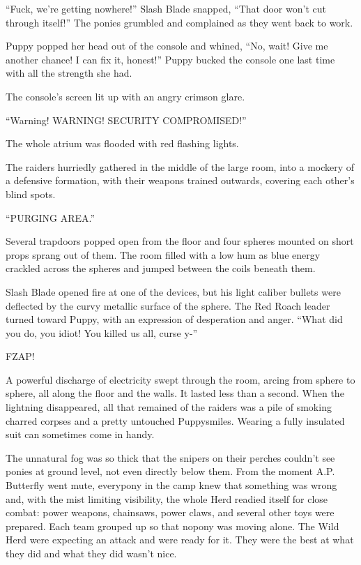 ``Fuck, we're getting nowhere!'' Slash Blade snapped, ``That door won't cut through itself!'' The ponies grumbled and complained as they went back to work.

Puppy popped her head out of the console and whined, ``No, wait! Give me another chance! I can fix it, honest!'' Puppy bucked the console one last time with all the strength she had.

The console's screen lit up with an angry crimson glare.

``{\mt Warning! WARNING! SECURITY COMPROMISED!}''

The whole atrium was flooded with red flashing lights.

The raiders hurriedly gathered in the middle of the large room, into a mockery of a defensive formation, with their weapons trained outwards, covering each other's blind spots.

``{\mt PURGING AREA.}''

Several trapdoors popped open from the floor and four spheres mounted on short props sprang out of them. The room filled with a low hum as blue energy crackled across the spheres and jumped between the coils beneath them.

Slash Blade opened fire at one of the devices, but his light caliber bullets were deflected by the curvy metallic surface of the sphere. The Red Roach leader turned toward Puppy, with an expression of desperation and anger. ``What did you do, you idiot! You killed us all, curse y-''

FZAP!

A powerful discharge of electricity swept through the room, arcing from sphere to sphere, all along the floor and the walls. It lasted less than a second. When the lightning disappeared, all that remained of the raiders was a pile of smoking charred corpses and a pretty untouched Puppysmiles. Wearing a fully insulated suit can sometimes come in handy.

\horizonline


The unnatural fog was so thick that the snipers on their perches couldn't see ponies at ground level, not even directly below them. From the moment A.P. Butterfly went mute, everypony in the camp knew that something was wrong and, with the mist limiting visibility, the whole Herd readied itself for close combat: power weapons, chainsaws, power claws, and several other toys were prepared. Each team grouped up so that nopony was moving alone. The Wild Herd were expecting an attack and were ready for it. They were the best at what they did and what they did wasn't nice.

